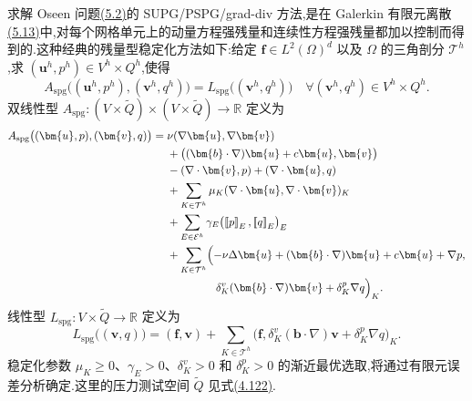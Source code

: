 \begin{note}\label{note:oseen-spg-method}
求解 Oseen 问题\hyperref[eq:oseen-weak]{(5.2)}的 SUPG/PSPG/grad-div 方法,是在 Galerkin 有限元离散\hyperref[eq:oseen-galerkin-fem]{(5.13)}中,对每个网格单元上的动量方程强残量和连续性方程强残量都加以控制而得到的.这种经典的残量型稳定化方法如下:给定 $\bm{f}\in L^2(\Omega)^d$ 以及 $\Omega$ 的三角剖分 $\mathcal{T}^h$,求 $(\bm{u}^h,p^h)\in V^h\times Q^h$,使得
\begin{equation}\label{eq:oseen-spg-problem}
  A_{\mathrm{spg}}\bigl((\bm{u}^h,p^h),(\bm{v}^h,q^h)\bigr)
   =L_{\mathrm{spg}}\bigl((\bm{v}^h,q^h)\bigr)
  \quad\forall(\bm{v}^h,q^h)\in V^h\times Q^h.
\end{equation}
双线性型 $A_{\mathrm{spg}}:(V\times\widetilde Q)\times(V\times\widetilde Q)\to\mathbb{R}$ 定义为
\begin{equation}\label{eq:oseen-spg-bilinear-form}
\begin{aligned}
 A_{\mathrm{spg}}\bigl((\bm{u},p),(\bm{v},q)\bigr)
  ={}&\nu(\nabla\bm{u},\nabla\bm{v})\\
   &+\bigl((\bm{b}\cdot\nabla)\bm{u}+c\bm{u},\bm{v}\bigr)\\
   &-(\nabla\cdot\bm{v},p)+(\nabla\cdot\bm{u},q)\\
   &+\sum_{K\in\mathcal{T}^h}
       \mu_K(\nabla\cdot\bm{u},\nabla\cdot\bm{v})_K\\
   &+\sum_{E\in\mathcal{E}^h}
       \gamma_E\bigl(\left[\!\left[p\right]\!\right]_E,
                      \left[\!\left[q\right]\!\right]_E\bigr)_E\\
   &+\sum_{K\in\mathcal{T}^h}
      \Bigl(-\nu\Delta\bm{u}
           +(\bm{b}\cdot\nabla)\bm{u}
           +c\bm{u}+\nabla p,\\
   &\hspace{4.4em}
       \delta_K^v(\bm{b}\cdot\nabla)\bm{v}
           +\delta_K^p\nabla q\Bigr)_K.
\end{aligned}
\end{equation}
线性型 $L_{\mathrm{spg}}:V\times\widetilde Q\to\mathbb{R}$ 定义为
\begin{equation}\label{eq:oseen-spg-linear-form}
  L_{\mathrm{spg}}\bigl((\bm{v},q)\bigr)
   =(\bm{f},\bm{v})
    +\sum_{K\in\mathcal{T}^h}
       \bigl(\bm{f},
          \delta_K^v(\bm{b}\cdot\nabla)\bm{v}
            +\delta_K^p\nabla q\bigr)_K.
\end{equation}
稳定化参数 $\mu_K\ge0$、$\gamma_E>0$、$\delta_K^v>0$ 和 $\delta_K^p>0$ 的渐近最优选取,将通过有限元误差分析确定.这里的压力测试空间 $\widetilde Q$ 见式\hyperref[eq:stokes-pspg-pressure-test-space]{(4.122)}.


\end{note}
